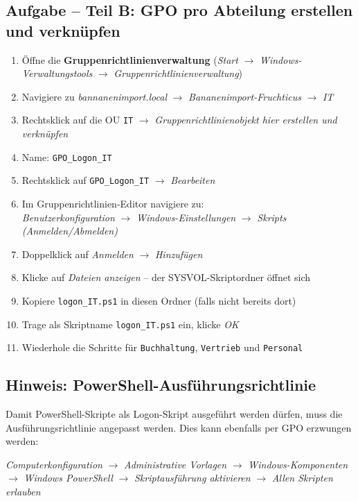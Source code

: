 \documentclass[11pt, oneside, numbers=noenddot]{scrbook}
\begin{document}
\subsection*{Aufgabe -- Teil B: GPO pro Abteilung erstellen und verknüpfen}
\begin{enumerate}
  \item Öffne die \textbf{Gruppenrichtlinienverwaltung} (\textit{Start} $\rightarrow$ \textit{Windows-Verwaltungstools} $\rightarrow$ \textit{Gruppenrichtlinienverwaltung})
  \item Navigiere zu \textit{bannanenimport.local} $\rightarrow$ \textit{Bananenimport-Fruchticus} $\rightarrow$ \textit{IT}
  \item Rechtsklick auf die OU \texttt{IT} $\rightarrow$ \textit{Gruppenrichtlinienobjekt hier erstellen und verknüpfen}
  \item Name: \texttt{GPO\_Logon\_IT}
  \item Rechtsklick auf \texttt{GPO\_Logon\_IT} $\rightarrow$ \textit{Bearbeiten}
  \item Im Gruppenrichtlinien-Editor navigiere zu:\\
        \textit{Benutzerkonfiguration} $\rightarrow$ \textit{Windows-Einstellungen} $\rightarrow$ \textit{Skripts (Anmelden/Abmelden)}
  \item Doppelklick auf \textit{Anmelden} $\rightarrow$ \textit{Hinzufügen}
  \item Klicke auf \textit{Dateien anzeigen} -- der SYSVOL-Skriptordner öffnet sich
  \item Kopiere \texttt{logon\_IT.ps1} in diesen Ordner (falls nicht bereits dort)
  \item Trage als Skriptname \texttt{logon\_IT.ps1} ein, klicke \textit{OK}
  \item Wiederhole die Schritte für \texttt{Buchhaltung}, \texttt{Vertrieb} und \texttt{Personal}
\end{enumerate}

\subsection*{Hinweis: PowerShell-Ausführungsrichtlinie}
Damit PowerShell-Skripte als Logon-Skript ausgeführt werden dürfen, muss die Ausführungsrichtlinie angepasst werden. Dies kann ebenfalls per GPO erzwungen werden:

\textit{Computerkonfiguration} $\rightarrow$ \textit{Administrative Vorlagen} $\rightarrow$ \textit{Windows-Komponenten} $\rightarrow$ \textit{Windows PowerShell} $\rightarrow$ \textit{Skriptausführung aktivieren} $\rightarrow$ \textit{Allen Skripten erlauben}
\end{document}
